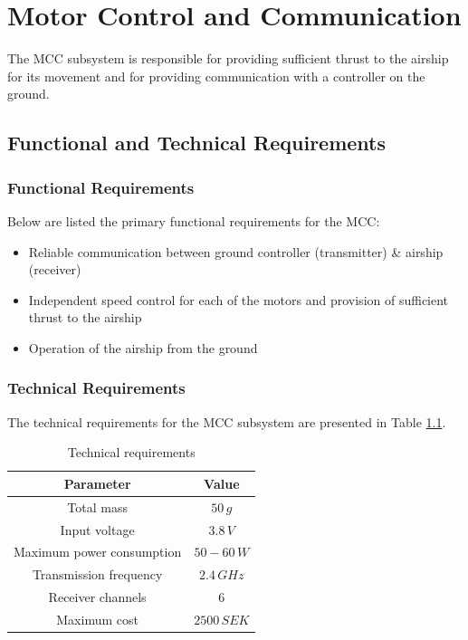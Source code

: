 \chapter{Motor Control and Communication}
\label{chap:mcc}

The \ac{MCC} subsystem is responsible for providing sufficient thrust to the airship for its movement and for providing communication with a controller on the ground.

\section{Functional and Technical Requirements}

\subsection{Functional Requirements}

Below are listed the primary functional requirements for the \ac{MCC}:

\begin{itemize}
\item Reliable communication between ground controller (transmitter) \& airship (receiver)
\item Independent speed control for each of the motors and provision of sufficient thrust to the airship
\item Operation of the airship from the ground 
\end{itemize}

\subsection{Technical Requirements}

The technical requirements for the \ac{MCC} subsystem are presented in Table \ref{tab:technical}.

\begin{table}[H]
\centering
\caption{Technical requirements}
\label{tab:technical}
\begin{tabular}{c c}
\hline
\textbf{Parameter} & \textbf{Value}\\ \hline
Total mass & $50\,g$\\
Input voltage & $3.8\,V$\\
Maximum power consumption & $50-60\,W$\\
Transmission frequency & $2.4\,GHz$\\
Receiver channels & $6$\\
Maximum cost & $2500\,SEK$\\
\hline
\end{tabular}
\end{table}

